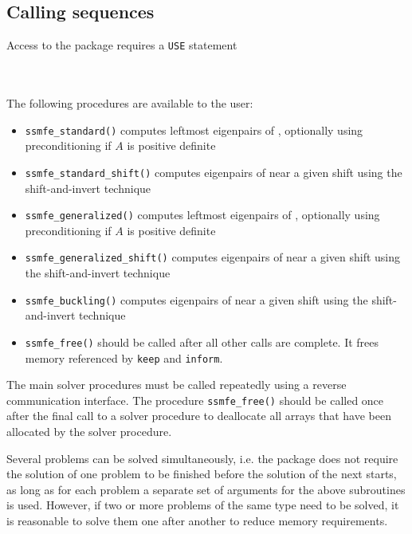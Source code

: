 \subsection{Calling sequences}

Access to the package requires a {\tt USE} statement \\ \\
\indent{} \\

\medskip

\noindent The following procedures are available to the user:
%
\begin{itemize}
\vspace{-0.1cm}
\item {\tt ssmfe\_standard()} 
computes leftmost eigenpairs of , 
optionally using preconditioning if $A$ is positive definite
\item {\tt ssmfe\_standard\_shift()} 
computes eigenpairs of  near a given shift
using the shift-and-invert technique
\item {\tt ssmfe\_generalized()} 
computes leftmost eigenpairs of 
, optionally using preconditioning if $A$ is positive definite
\item {\tt ssmfe\_generalized\_shift()} 
computes eigenpairs of 
 near a given shift
using the shift-and-invert technique
\item {\tt ssmfe\_buckling()} 
computes eigenpairs of 
 near a given shift
using the shift-and-invert technique
\item {\tt ssmfe\_free()}  should be called after all other calls
are complete. It frees memory referenced by \texttt{keep} and \texttt{inform}.
%
\end{itemize}

The main solver procedures
must be called repeatedly using
a reverse communication interface.
The procedure \texttt{ssmfe\_free()} 
should be called once after the
final call to 
a solver procedure
to deallocate all arrays 
that have been allocated by
the solver procedure.

Several problems can be solved simultaneously,
i.e. the package does not require the solution of
one problem to be finished before the solution of
the next starts, as long as for each problem a separate set
of arguments for the above subroutines is used.
However, if two or more problems of the same type
need to be solved, it is reasonable to solve them one
after another  to reduce  memory requirements.
\fi

